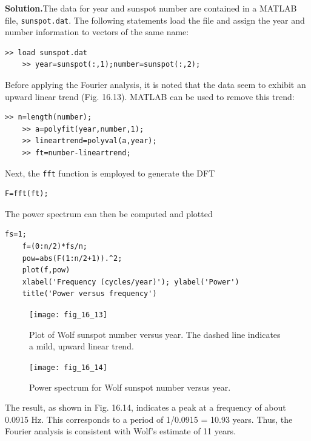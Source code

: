 \documentclass[../main.tex]{subfiles}
\begin{document}
\noindent\textbf{Solution.}\quad  The data for year and sunspot number are contained in a MATLAB file,
\texttt{sunspot.dat}. The following statements load the file and assign the year and number information to vectors of the same name:

\begin{lstlisting}[numbers=none]
	>> load sunspot.dat
	>> year=sunspot(:,1);number=sunspot(:,2);
\end{lstlisting}

\noindent Before applying the Fourier analysis, it is noted that the data seem to exhibit an upward linear trend (Fig. 16.13). MATLAB can be used to remove this trend:

\begin{lstlisting}[numbers=none]
	>> n=length(number);
	>> a=polyfit(year,number,1);
	>> lineartrend=polyval(a,year);
	>> ft=number-lineartrend;
\end{lstlisting}

\noindent Next, the \texttt{fft} function is employed to generate the DFT

\begin{lstlisting}[numbers=none]
	F=fft(ft);
\end{lstlisting}

\noindent The power spectrum can then be computed and plotted

\begin{lstlisting}[numbers=none]
	fs=1;
	f=(0:n/2)*fs/n;
	pow=abs(F(1:n/2+1)).^2;
	plot(f,pow)
	xlabel('Frequency (cycles/year)'); ylabel('Power')
	title('Power versus frequency')
\end{lstlisting}

\begin{figure}[H] 
	\centering
	\texttt{[image: fig\_16\_13]}
	\caption{\textsf{Plot of Wolf sunspot number versus year. The dashed line indicates a mild, upward linear trend.}}
	\label{fig:fig_16_13}
\end{figure}

\begin{figure}[H] 
	\centering
	\texttt{[image: fig\_16\_14]}
	\caption{\textsf{Power spectrum for Wolf sunspot number versus year.}}
	\label{fig:fig_16_14}
\end{figure}

\noindent The result, as shown in Fig. 16.14, indicates a peak at a frequency of about 0.0915 Hz. This
corresponds to a period of 1/0.0915 = 10.93 years. Thus, the Fourier analysis is consistent
with Wolf's estimate of 11 years.
\end{document}
